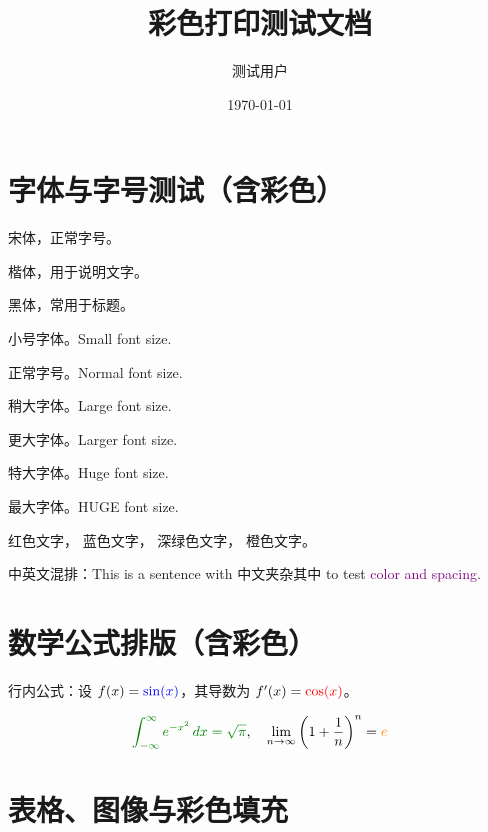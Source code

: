 \documentclass[a4paper,10pt]{ctexart}
\title{彩色打印测试文档}
\author{测试用户}
\date{\today}
\begin{document}
\maketitle

\section*{字体与字号测试（含彩色）}

{\songti 宋体，正常字号。\par}
{\kaishu 楷体，用于说明文字。\par}
{\heiti 黑体，常用于标题。\par}

{\small 小号字体。Small font size.}
\par
{\normalsize 正常字号。Normal font size.}
\par
{\large 稍大字体。Large font size.}
\par
{\Large 更大字体。Larger font size.}
\par
{\huge 特大字体。Huge font size.}
\par
{\Huge 最大字体。HUGE font size.}

\bigskip

{\color{red} 红色文字}，{\color{blue} 蓝色文字}，{\color{green!70!black} 深绿色文字}，{\color{orange} 橙色文字}。

中英文混排：This is a sentence with 中文夹杂其中 to test \textcolor{purple}{color and spacing}.

\section*{数学公式排版（含彩色）}

行内公式：设 $f(x) = \textcolor{blue}{\sin(x)}$，其导数为 $f'(x) = \textcolor{red}{\cos(x)}$。

\[
\textcolor{green!50!black}{\int_{-\infty}^{\infty} e^{-x^2} \, dx = \sqrt{\pi}}, \quad
\lim_{n \to \infty} \left(1 + \frac{1}{n}\right)^n = \textcolor{orange}{e}
\]

\section*{表格、图像与彩色填充}
\end{document}
